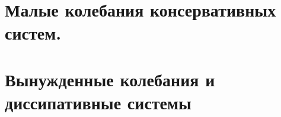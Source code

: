 


\section{Малые колебания консервативных систем.}

% 

\section{Вынужденные колебания и диссипативные системы}
